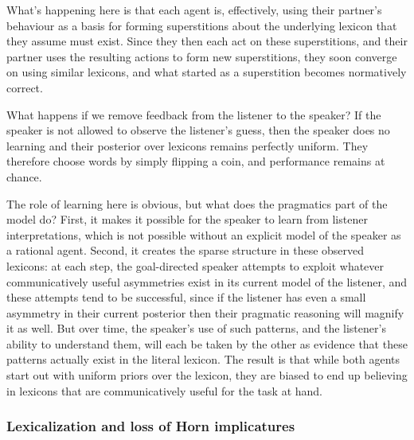 \documentclass{article} %
\begin{document}
What's happening here is that each agent is, effectively, using their partner's behaviour as a basis for forming superstitions about the underlying lexicon that they assume must exist. Since they then each act on these superstitions, and their partner uses the resulting actions to form new superstitions, they soon converge on using similar lexicons, and what started as a superstition becomes normatively correct.

What happens if we remove feedback from the listener to the speaker? If the speaker is not allowed to observe the listener's guess, then the speaker does no learning and their posterior over lexicons remains perfectly uniform. They therefore choose words by simply flipping a coin, and performance remains at chance.

The role of learning here is obvious, but what does the pragmatics part of the model do? First, it makes it possible for the speaker to learn from listener interpretations, which is not possible without an explicit model of the speaker as a rational agent. Second, it creates the sparse structure in these observed lexicons: at each step, the goal-directed speaker attempts to exploit whatever communicatively useful asymmetries exist in its current model of the listener, and these attempts tend to be successful, since if the listener has even a small asymmetry in their current posterior then their pragmatic reasoning will magnify it as well. But over time, the speaker's use of such patterns, and the listener's ability to understand them, will each be taken by the other as evidence that these patterns actually exist in the literal lexicon. The result is that while both agents start out with uniform priors over the lexicon, they are biased to end up believing in lexicons that are communicatively useful for the task at hand.


\subsubsection{Lexicalization and loss of Horn implicatures}
\label{sec:horn-emergence}
\end{document}
